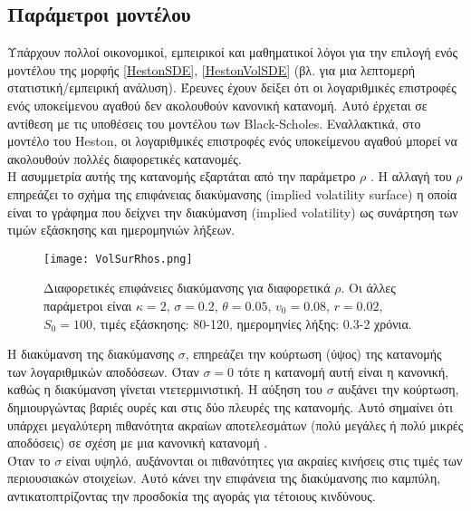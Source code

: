 \documentclass[12pt,a4paper,twoside,openany]{book}
\begin{document}
\subsection{Παράμετροι μοντέλου}
\vspace{2.5mm}
	Υπάρχουν πολλοί οικονομικοί, εμπειρικοί και μαθηματικοί λόγοι για την επιλογή ενός μοντέλου της μορφής \eqref{HestonSDE}, \eqref{HestonVolSDE}  (βλ.\cite{Asset returns} για μια λεπτομερή στατιστική/εμπειρική ανάλυση).
	Έρευνες έχουν δείξει ότι οι λογαριθμικές επιστροφές ενός υποκείμενου αγαθού δεν ακολουθούν κανονική κατανομή. Αυτό έρχεται σε αντίθεση με τις υποθέσεις του μοντέλου των Black-Scholes. Εναλλακτικά, στο μοντέλο του Heston, οι λογαριθμικές επιστροφές ενός υποκείμενου αγαθού μπορεί να ακολουθούν πολλές διαφορετικές κατανομές. 
	\vspace{2.5mm}\\
	Η ασυμμετρία αυτής της κατανομής εξαρτάται από την παράμετρο $\rho$ \cite{Heston}. Η αλλαγή του $\rho$ επηρεάζει το σχήμα της επιφάνειας διακύμανσης (implied volatility surface) η οποία είναι το γράφημα που δείχνει την διακύμανση (implied volatility) ως συνάρτηση των τιμών εξάσκησης και ημερομηνιών λήξεων.\\
	
	
	\begin{figure}[h]
		\centering
		\texttt{[image: VolSurRhos.png]}
		\caption{Διαφορετικές επιφάνειες διακύμανσης για διαφορετικά $\rho$. Οι άλλες παράμετροι είναι $\kappa=2$,  $\sigma=0.2$, $\theta=0.05$, $v_0=0.08$, $r=0.02$, $S_0=100$, τιμές εξάσκησης: 80-120, ημερομηνίες λήξης: 0.3-2 χρόνια.}
		\label{fig:VolSurRhos}
	\end{figure}
	
	\noindent Η διακύμανση της διακύμανσης $\sigma$, επηρεάζει την κούρτωση (ύψος) της κατανομής των λογαριθμικών αποδόσεων. Όταν $\sigma=0$ τότε η κατανομή αυτή είναι η κανονική, καθώς η διακύμανση γίνεται ντετερμινιστική. Η αύξηση του $\sigma$ αυξάνει την κούρτωση, δημιουργώντας βαριές ουρές και στις δύο πλευρές της κατανομής. Αυτό σημαίνει ότι υπάρχει μεγαλύτερη πιθανότητα ακραίων αποτελεσμάτων (πολύ μεγάλες ή πολύ μικρές αποδόσεις) σε σχέση με μια κανονική κατανομή \cite{Heston}.
	\vspace{2.5mm}\\
	Όταν το $\sigma$ είναι υψηλό, αυξάνονται οι πιθανότητες για ακραίες κινήσεις στις τιμές των περιουσιακών στοιχείων. Αυτό κάνει την επιφάνεια της διακύμανσης πιο καμπύλη, αντικατοπτρίζοντας την προσδοκία της αγοράς για τέτοιους κινδύνους.
	
\end{document}
